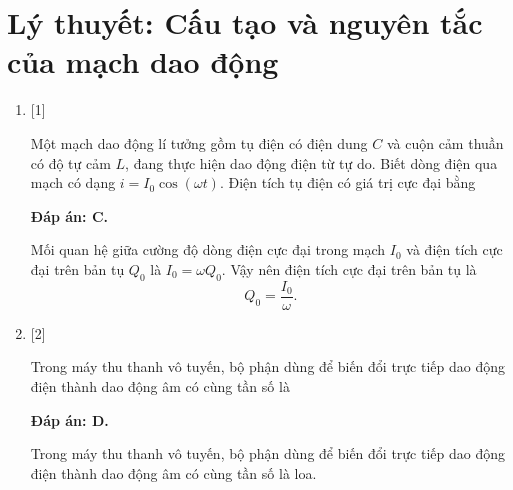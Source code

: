 
\setcounter{section}{0}

\section{Lý thuyết: Cấu tạo và nguyên tắc của mạch dao động}
\begin{enumerate}[label=\bfseries Câu \arabic*:]
	\item {} [1] %
	
	\cauhoi
	{Một mạch dao động lí tưởng gồm tụ điện có điện dung $C$ và cuộn cảm thuần có độ tự cảm $L$, đang thực hiện dao động điện từ tự do. Biết dòng điện qua mạch có dạng $i = I_0 \cos \left( \omega t \right)$. Điện tích tụ điện có giá trị cực đại bằng
	}
	
	\loigiai
	{		\textbf{Đáp án: C.}
		
		Mối quan hệ giữa cường độ dòng điện cực đại trong mạch $I_0$ và điện tích cực đại trên bản tụ $Q_0$ là $I_0 = \omega Q_0$. Vậy nên điện tích cực đại trên bản tụ là 
		$$Q_0 = \dfrac{I_0}{\omega}.$$
		
	}

	\item {} [2] %
	
	\cauhoi
	{Trong máy thu thanh vô tuyến, bộ phận dùng để biến đổi trực tiếp dao động điện thành dao động âm có cùng tần số là
	}
	
	\loigiai
	{		\textbf{Đáp án: D.}
		
		Trong máy thu thanh vô tuyến, bộ phận dùng để biến đổi trực tiếp dao động điện thành dao động âm có cùng tần số là loa.
		
}
\end{enumerate}
